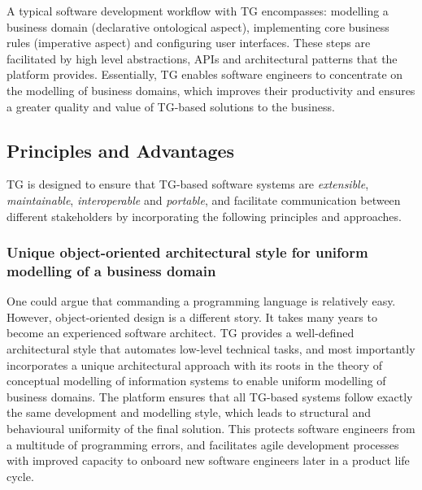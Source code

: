 \documentclass[a4paper,10pt,twocolumn,oneside,openright,final]{memoir}
\begin{document}
  \noindent A typical software development workflow with TG encompasses: modelling a business domain (declarative ontological aspect), implementing core business rules (imperative aspect) and configuring user interfaces.
  These steps are facilitated by high level abstractions, APIs and architectural patterns that the platform provides.
  Essentially, TG enables software engineers to concentrate on the modelling of business domains, which improves their productivity and ensures a greater quality and value of TG-based solutions to the business.


 \subsection*{Principles and Advantages}
  	TG is designed to ensure that TG-based software systems are \emph{extensible}, \emph{maintainable}, \emph{interoperable} and \emph{portable}, and facilitate communication between different stakeholders by incorporating the following principles and approaches.

\subsubsection*{Unique object-oriented architectural style for uniform modelling of a business domain}
	One could argue that commanding a programming language is relatively easy.
  	However, object-oriented design is a different story.
  	It takes many years to become an experienced software architect.
  	TG provides a well-defined architectural style that automates low-level technical tasks, and most importantly incorporates a unique architectural approach with its roots in the theory of conceptual modelling of information systems to enable uniform modelling of business domains.
	The platform ensures that all TG-based systems follow exactly the same development and modelling style, which leads to structural and behavioural uniformity of the final solution.
  	This protects software engineers from a multitude of programming errors, and facilitates agile development processes with improved capacity to onboard new software engineers later in a product life cycle.
\end{document}
